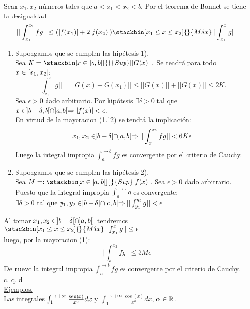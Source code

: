 Sean $x_1,x_2$ números tales que $a<x_1<x_2<b$. Por el teorema de Bonnet se tiene la desigualdad: 
\begin{equation}
|| \int_{x_1}^{x_2}fg || \leq (|f(x_1)|+2|f(x_2)|) \stackbin[x_1 \leq x \leq x_2]{}{M\acute{a}x}|| \int_{x_1}^x g ||
\end{equation}

\begin{enumerate}
\item Supongamos que se cumplen las hipótesis 1).  \\
Sea $K=\stackbin[\x \en [a,b[]{}{Sup}||G(x)||.$ Se tendrá para todo $x \in [x_1,x_2]$:
\begin{equation}
|| \int_{x_1}^x g|| = || G(x)-G(x_1) || \leq || G(x) || + || G(x) || \leq 2K.
\end{equation}
Sea $\epsilon >0$ dado arbitrario. Por hipótesis $\exists \delta>0$ tal que $x \in ]b-\delta,b[ \cap ]a,b[ \Rightarrow |f(x)| <\epsilon$.\\
En virtud de la mayoracion (1.12) se tendrá la implicación:\\
$$
x_1,x_2\in ]b-\delta [ \cap ]a,b[ \Rightarrow || \int_{x_1}^{x_2}fg || < 6K\epsilon
$$
Luego la integral impropia $\int_a^{\to b}fg $ es convergente por el criterio de Cauchy.\\

\item Supongamos que se cumplen las hipótesis 2). \\
Sea $M=:\stackbin[\x \en [a,b[]{}{Sup}|f(x)|$. Sea $\epsilon>0$ dado arbitrario.\\
Puesto que la integral impropia $\int_a^{\to b}g$ es convergente:\\

$\exists \delta >0$ tal que $y_1,y_2 \in ]b-\delta [ \cap ]a,b[ \Rightarrow || \int_{y_1}^{y_2}g|| < \epsilon$
\end{enumerate}
Al tomar $x_1,x_2 \in  ]b-\delta [ \cap ]a,b[$, tendremos $\stackbin[x_1 \leq x \leq x_2]{}{M\acute{a}x} || \int_{x_1}^x g || \leq \epsilon$ \\
luego, por la mayoracion (1): \\
$$
|| \int_{x_1}^{x_2}fg|| \leq 3M \epsilon
$$
De nuevo la integral impropia $\int_a^{\to b}fg$ es convergente  por el criterio de Cauchy. \\
\phantom{llenado doble y múltiple ya que necesito espacio para escribir:} c. q. d \\
\underline{Ejemplos.}\\
Las integrales $\int_1^{\to +\infty}\frac{\operatorname{sen} (x)}{x^\alpha}dx$ y $\int_1^{\to +\infty} \frac{\cos (x)}{x^\alpha}dx$, $\alpha \in \mathbb{R}$. \\ \\
